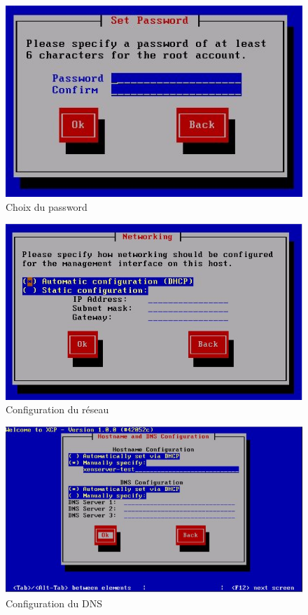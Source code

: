 \begin{figure}
\begin{center}
\includegraphics[width=350pt]{images/7.png}
\end{center}
\caption{Choix du password}
\end{figure}
\begin{figure}
\begin{center}
\includegraphics[width=350pt]{images/8.png}
\end{center}
\caption{Configuration du réseau}
\end{figure}
\begin{figure}
\begin{center}
\includegraphics[width=350pt]{images/9.png}
\end{center}
\caption{Configuration du DNS}
\end{figure}
